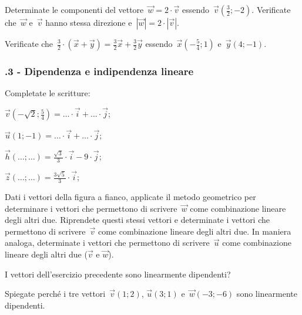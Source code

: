 \begin{esercizio}
\label{ese:F.5}
Determinate le componenti del vettore~$\vec{w}=2 \cdot \vec{v}$ essendo~$\vec{v}(\frac{3}{2};-2)$. Verificate che~$\vec{w}$ e~$\vec{v}$ hanno stessa direzione
e~$|\vec{w}|=2 \cdot |\vec{v}|$.
\end{esercizio}

\begin{esercizio}
\label{ese:F.6}
Verificate che~$\frac{3}{2} \cdot (\vec{x}+\vec{y})=\frac{3}{2}\vec{x}+\frac{3}{2}\vec{y}$ essendo~$\vec{x}(-\frac{5}{4};1)$ e~$\vec{y}(4;-1)$.
\end{esercizio}
\pagebreak
\subsubsection*{\thechapter.3 - Dipendenza e indipendenza lineare}
\begin{esercizio}
\label{ese:F.7}
Completate le scritture:
\begin{multicols}{2}
\begin{enumeratea}
\item $\vec{v}(-\sqrt{2};\frac {5}{4})=\ldots \cdot \vec{i}+\ldots \cdot \vec{j}$;
\item $\vec{u}(1;-1)=\ldots \cdot \vec{i}+\ldots \cdot \vec{j}$;
\item $\vec{h}(\ldots;\ldots)=\frac {\sqrt{3}}{3} \cdot \vec{i}-9 \cdot \vec{j}$;
\item $\vec{z}(\ldots;\ldots)=\frac {3 \sqrt{5}}{3} \cdot \vec{i}$;
\end{enumeratea}
\end{multicols}
\end{esercizio}

\begin{esercizio}
\label{ese:F.8}
\begin{multicols}{2}
 Dati i vettori della figura a fianco, applicate il metodo geometrico per determinare i vettori che permettono di scrivere~$\vec{w}$ come combinazione lineare degli altri due.
Riprendete questi stessi vettori e determinate i vettori che permettono di scrivere~$\vec{v}$ come combinazione lineare degli altri due. In maniera analoga, determinate i vettori che permettono di scrivere~$\vec{u}$ come combinazione lineare degli altri due ($\vec{v}$ e $\vec{w}$).
\begin{center}

\end{center}
\end{multicols}
\end{esercizio}

\begin{esercizio}
\label{ese:F.9}
I vettori dell'esercizio precedente sono linearmente dipendenti?
\end{esercizio}

\begin{esercizio}
\label{ese:F.10}
Spiegate perché i tre vettori~$\vec{v}(1;2)$, $\vec{u}(3;1)$ e~$\vec{w}(-3;-6)$ sono linearmente dipendenti.
\end{esercizio}

